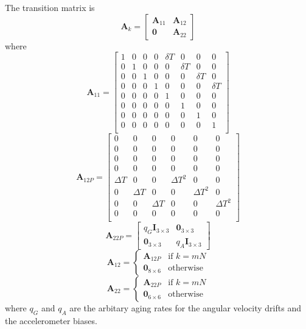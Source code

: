 \documentclass[a4paper]{report}
\numberwithin{equation}{chapter}
\newcommand{\mat}[1]{\boldsymbol{#1}}
\begin{document}
The transition matrix is
\begin{equation}
\mat{A}_k =
\begin{bmatrix}
\mat{A}_{11} & \mat{A}_{12}\\
\mat{0} & \mat{A}_{22}
\end{bmatrix}
\end{equation}
where
\begin{equation}
\mat{A}_{11} =
\begin{bmatrix}
1 & 0 & 0 & 0 & \delta T & 0 & 0 & 0\\
0 & 1 & 0 & 0 & 0 & \delta T & 0 & 0\\
0 & 0 & 1 & 0 & 0 & 0 & \delta T & 0\\
0 & 0 & 0 & 1 & 0 & 0 & 0 & \delta T\\
0 & 0 & 0 & 0 & 1 & 0 & 0 & 0\\
0 & 0 & 0 & 0 & 0 & 1 & 0 & 0\\
0 & 0 & 0 & 0 & 0 & 0 & 1 & 0\\
0 & 0 & 0 & 0 & 0 & 0 & 0 & 1\\
\end{bmatrix}
\end{equation}
\begin{equation}
\mat{A}_{12P} =
\begin{bmatrix}
0 & 0 & 0 & 0 & 0 & 0\\
0 & 0 & 0 & 0 & 0 & 0\\
0 & 0 & 0 & 0 & 0 & 0\\
0 & 0 & 0 & 0 & 0 & 0\\
\Delta T & 0 & 0 & \Delta T^2 & 0 & 0\\
0 & \Delta T & 0 & 0 & \Delta T^2 & 0\\
0 & 0 & \Delta T & 0 & 0 & \Delta T^2\\
0 & 0 & 0 & 0 & 0 & 0\\
\end{bmatrix}
\end{equation}
\begin{equation}
\mat{A}_{22P} =
\begin{bmatrix}
q_G \mat{I}_{3 \times 3} & \mat{0}_{3 \times 3}\\
\mat{0}_{3 \times 3} & q_A \mat{I}_{3 \times 3}
\end{bmatrix}
\end{equation}
\begin{equation}
\mat{A}_{12} =
\begin{cases}
\mat{A}_{12P} & \text{if $k = mN$}\\
\mat{0}_{8 \times 6} & \text{otherwise}
\end{cases}
\end{equation}
\begin{equation}
\mat{A}_{22} =
\begin{cases}
\mat{A}_{22P} & \text{if $k = mN$}\\
\mat{0}_{6 \times 6} & \text{otherwise}
\end{cases}
\end{equation}
where $q_G$ and $q_A$ are the arbitary aging rates for the angular velocity drifts and the accelerometer biases.
\end{document}
